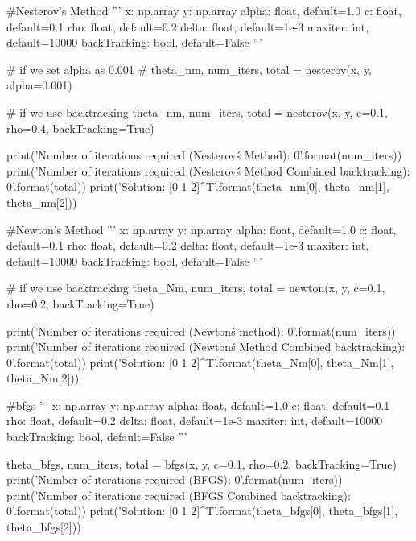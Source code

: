 \documentclass[12pt, a4 paper]{article}
\begin{document}
\begin{python}
#Nesterov's Method
'''
x: np.array
y: np.array
alpha: float, default=1.0
c: float, default=0.1
rho: float, default=0.2
delta: float, default=1e-3
maxiter: int, default=10000
backTracking: bool, default=False
'''

# if we set alpha as 0.001
# theta_nm, num_iters, total = nesterov(x, y, alpha=0.001)

# if we use backtracking
theta_nm, num_iters, total = nesterov(x, y, c=0.1, rho=0.4, backTracking=True)


print('Number of iterations required (Nesterov\'s Method): {0}'.format(num_iters))
print('Number of iterations required (Nesterov\'s Method Combined backtracking): {0}'.format(total))
print('Solution: [{0} {1} {2}]^T'.format(theta_nm[0], theta_nm[1], theta_nm[2]))

#Newton's Method
'''
x: np.array
y: np.array
alpha: float, default=1.0
c: float, default=0.1
rho: float, default=0.2
delta: float, default=1e-3
maxiter: int, default=10000
backTracking: bool, default=False
'''

# if we use backtracking
theta_Nm, num_iters, total = newton(x, y, c=0.1, rho=0.2, backTracking=True)

print('Number of iterations required (Newton\'s method): {0}'.format(num_iters))
print('Number of iterations required (Newton\'s Method  Combined backtracking): {0}'.format(total))
print('Solution: [{0} {1} {2}]^T'.format(theta_Nm[0], theta_Nm[1], theta_Nm[2]))

#bfgs
'''
x: np.array
y: np.array
alpha: float, default=1.0
c: float, default=0.1
rho: float, default=0.2
delta: float, default=1e-3
maxiter: int, default=10000
backTracking: bool, default=False
'''

theta_bfgs, num_iters, total = bfgs(x, y, c=0.1, rho=0.2, backTracking=True)
print('Number of iterations required (BFGS): {0}'.format(num_iters))
print('Number of iterations required (BFGS Combined backtracking): {0}'.format(total))
print('Solution: [{0} {1} {2}]^T'.format(theta_bfgs[0], theta_bfgs[1], theta_bfgs[2]))
        \end{python}
\end{document}
